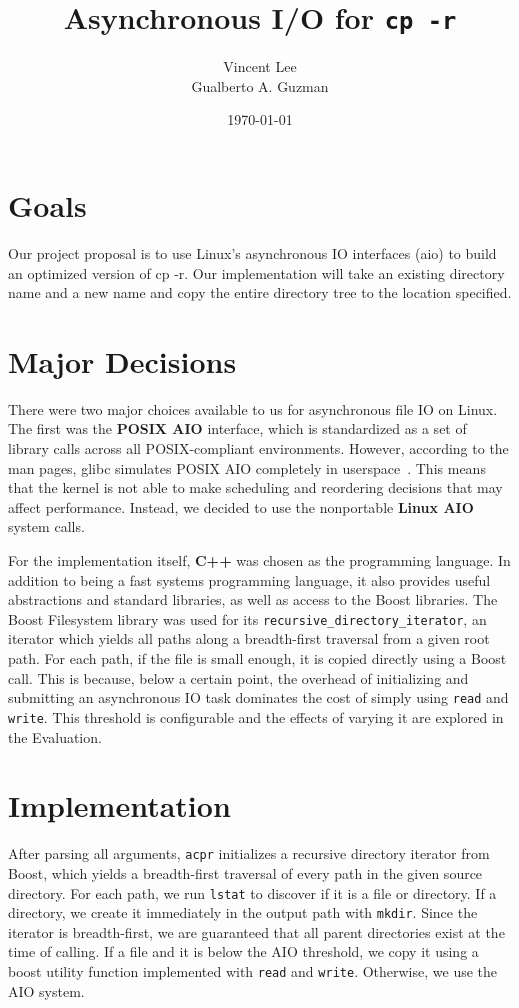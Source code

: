 \documentclass[11pt]{article}
\begin{document}
\title{Asynchronous I/O for \texttt{cp -r}}
\date{\today}
\author{Vincent Lee \\
        Gualberto A. Guzman}

\maketitle

\section{Goals}

Our project proposal is to use Linux's asynchronous IO interfaces (aio) to build
an optimized version of cp -r. Our implementation will take an existing
directory name and a new name and copy the entire directory tree to the location
specified.

\section{Major Decisions} 

There were two major choices available to us for asynchronous file IO on Linux.
The first was the \textbf{POSIX AIO} interface, which is standardized as a set
of library calls across all POSIX-compliant environments. However, according to
the man pages, glibc simulates POSIX AIO completely in userspace~\cite{aio7}.
This means that the kernel is not able to make scheduling and reordering
decisions that may affect performance. Instead, we decided to use the
nonportable \textbf{Linux AIO} system calls.

For the implementation itself, \textbf{C++} was chosen as the programming
language. In addition to being a fast systems programming language, it also
provides useful abstractions and standard libraries, as well as access to the
Boost libraries. The Boost Filesystem library was used for its
\texttt{recursive\_directory\_iterator}, an iterator which yields all paths
along a breadth-first traversal from a given root path. For each path, if the
file is small enough, it is copied directly using a Boost call. This is because,
below a certain point, the overhead of initializing and submitting an
asynchronous IO task dominates the cost of simply using \texttt{read} and
\texttt{write}. This threshold is configurable and the effects of varying it are
explored in the Evaluation.

\section{Implementation}
After parsing all arguments, \texttt{acpr} initializes a recursive directory iterator from Boost, which yields a breadth-first traversal of every path in the given source directory. For each path, we run \texttt{lstat} to discover if it is a file or directory. If a directory, we create it immediately in the output path with \texttt{mkdir}. Since the iterator is breadth-first, we are guaranteed that all parent directories exist at the time of calling. If a file and it is below the AIO threshold, we copy it using a boost utility function implemented with \texttt{read} and \texttt{write}. Otherwise, we use the AIO system.
\end{document}
